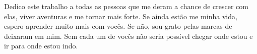 %
%

\begin{dedicatoria}

Dedico este trabalho a todas as pessoas que me deram a chance de crescer com elas, viver aventuras e me tornar mais forte. Se ainda estão me minha vida, espero aprender muito mais com vocês. Se não, sou grato pelas marcas de deixaram em mim. Sem cada um de vocês não seria possível chegar onde estou e ir para onde estou indo.

\end{dedicatoria}

